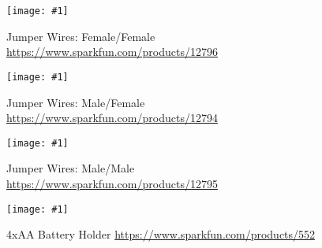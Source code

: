 \documentclass{article}
\newcommand{\imagefigs}[2]{
    \begin{figure}[H]
        \centering
        \texttt{[image: \#1]}
        \caption{#2}
    \end{figure}
}
\begin{document}
\begin{appendices}
    \imagefigs{resources/material-images/vendor-f-f-jumper}{Jumper Wires: Female/Female \href{https://www.sparkfun.com/products/12796}{https://www.sparkfun.com/products/12796}}
    \imagefigs{resources/material-images/vendor-f-m-jumper}{Jumper Wires: Male/Female \href{https://www.sparkfun.com/products/12794}{https://www.sparkfun.com/products/12794}}
    \imagefigs{resources/material-images/vendor-m-m-jumper}{Jumper Wires: Male/Male \href{https://www.sparkfun.com/products/12795}{https://www.sparkfun.com/products/12795}}
    \label{sec:vendor-wires}
    \imagefigs{resources/material-images/vendor-battery-holder}{4xAA Battery Holder \href{https://www.sparkfun.com/products/552}{https://www.sparkfun.com/products/552}
          \label{sec:vendor-batholder}}
\end{appendices}
%   
\end{document}
